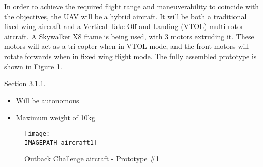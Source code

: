 In order to achieve the required flight range and maneuverability to coincide with the objectives, the UAV will be a hybrid aircraft. It will be both a traditional fixed-wing aircraft and a Vertical Take‐Off and Landing (VTOL) multi-rotor aircraft.  A Skywalker X8 frame is being used, with 3 motors extruding it. These motors will act as a tri-copter when in VTOL mode, and the front motors will rotate forwards when in fixed wing flight mode. The fully assembled prototype is shown in Figure \ref{fig:aircraft}. 

Section 3.1.1. 
\begin{itemize}
	\item Will be autonomous
	\item Maximum weight of 10kg
\end{itemize}

\begin{figure}[!h]
	\centering
	\texttt{[image: \\IMAGEPATH aircraft1]}
	\caption{Outback Challenge aircraft - Prototype \#1}
	\label{fig:aircraft}
\end{figure}
